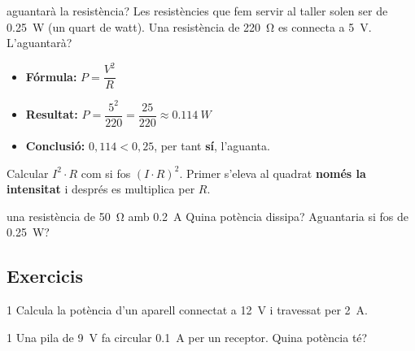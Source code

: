 \begin{exemple}{aguantarà la resistència?}
Les resistències que fem servir al taller solen ser de \SI{0,25}{W} (un quart de watt). Una resistència de \SI{220}{\ohm} es connecta a \SI{5}{V}. L'aguantarà?
\begin{itemize}
 \item \textbf{Fórmula:} $P = \dfrac{V^2}{R}$
 \item \textbf{Resultat:} $P = \dfrac{5^2}{220} = \dfrac{25}{220} \approx \SI{0,114}{W}$
 \item \textbf{Conclusió:} $0{,}114 < 0{,}25$, per tant \textbf{sí}, l'aguanta.
\end{itemize}
\end{exemple}

\begin{atencio}
Calcular $I^2 \cdot R$ com si fos $(I \cdot R)^2$. Primer s'eleva al quadrat \textbf{només la intensitat} i després es multiplica per $R$.
\end{atencio}

\begin{guiada}{una resistència de \SI{50}{\ohm} amb \SI{0,2}{A}}
Quina potència dissipa? Aguantaria si fos de \SI{0,25}{W}?
\end{guiada}

\subsection*{Exercicis}

\begin{exercici}{1}
Calcula la potència d'un aparell connectat a \SI{12}{V} i travessat per \SI{2}{A}.
\end{exercici}

\begin{exercici}{1}
Una pila de \SI{9}{V} fa circular \SI{0,1}{A} per un receptor. Quina potència té?
\end{exercici}

